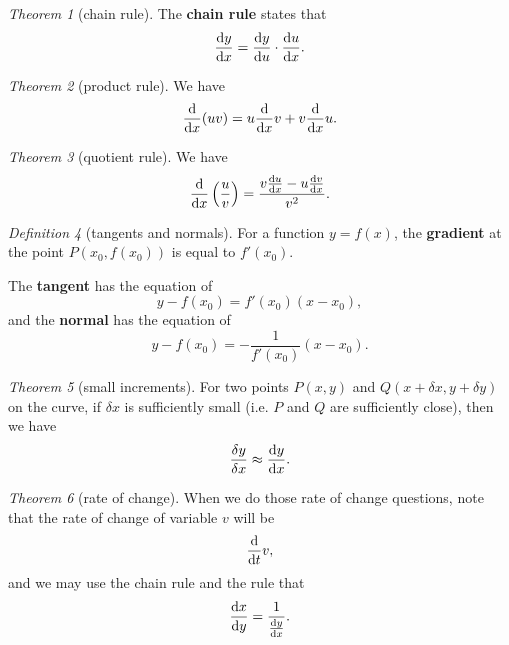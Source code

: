 \documentclass[8pt]{article}
\theoremstyle{remark}
\newtheorem{theorem}{Theorem}[section]
\newtheorem{definition}[theorem]{Definition}
\begin{document}
            \begin{theorem}[chain rule]
                The \textbf{chain rule} states that
                $$
                    \frac{\mathrm{d} y}{\mathrm{d} x} = \frac{\mathrm{d} y}{\mathrm{d} u} \cdot \frac{\mathrm{d} u}{\mathrm{d} x}.
                $$
            \end{theorem}

            \begin{theorem}[product rule]
                We have
                $$
                    \frac{\mathrm{d}}{\mathrm{d} x} (uv) = u \frac{\mathrm{d}}{\mathrm{d} x} v + v \frac{\mathrm{d}}{\mathrm{d} x} u.
                $$
            \end{theorem}

            \begin{theorem}[quotient rule]
                We have
                $$
                    \frac{\mathrm{d}}{\mathrm{d} x}\left(\frac{u}{v}\right) = \frac{v \frac{\mathrm{d} u}{\mathrm{d} x} - u \frac{\mathrm{d} v}{\mathrm{d} x}}{v^2}.
                $$
            \end{theorem}

            \begin{definition}[tangents and normals]
                For a function $y = f(x)$, the \textbf{gradient} at the point $P(x_0, f(x_0))$ is equal to $f'(x_0)$.

                The \textbf{tangent} has the equation of
                $$
                    y - f(x_0) = f'(x_0) (x - x_0),
                $$
                and the \textbf{normal} has the equation of
                $$
                    y - f(x_0) = - \frac{1}{f'(x_0)} (x - x_0).
                $$
            \end{definition}

            \begin{theorem}[small increments]
                For two points $P(x, y)$ and $Q(x + \delta x, y + \delta y)$ on the curve, if $\delta x$ is sufficiently small (i.e. $P$ and $Q$ are sufficiently close), then we have
                $$
                    \frac{\delta y}{\delta x} \approx \frac{\mathrm{d} y}{\mathrm{d} x}.
                $$
            \end{theorem}

            \begin{theorem}[rate of change]
                When we do those rate of change questions, note that the rate of change of variable $v$ will be
                $$
                    \frac{\mathrm{d}}{\mathrm{d} t} v,
                $$
                and we may use the chain rule and the rule that
                $$
                    \frac{\mathrm{d} x}{\mathrm{d} y} = \frac{1}{\frac{\mathrm{d} y}{\mathrm{d} x}}.
                $$
            \end{theorem}
\end{document}
